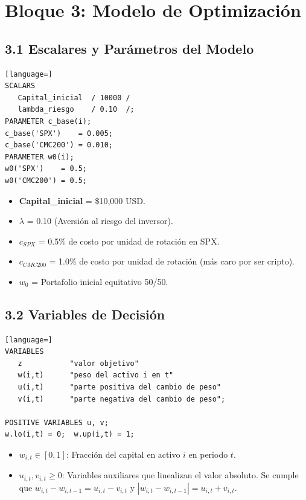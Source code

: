 \documentclass[11pt,a4paper]{article}
\begin{document}
\section{Bloque 3: Modelo de Optimización}

\subsection{3.1 Escalares y Parámetros del Modelo}
\begin{lstlisting}[language=]
SCALARS
   Capital_inicial  / 10000 /
   lambda_riesgo    / 0.10  /;
PARAMETER c_base(i);
c_base('SPX')    = 0.005;
c_base('CMC200') = 0.010;
PARAMETER w0(i);
w0('SPX')    = 0.5;
w0('CMC200') = 0.5;
\end{lstlisting}

\begin{itemize}
    \item \textbf{Capital\_inicial} = \$10,000 USD.
    \item \textbf{$\lambda$} = 0.10 (Aversión al riesgo del inversor).
    \item \textbf{$c_{SPX}$} = 0.5\% de costo por unidad de rotación en SPX.
    \item \textbf{$c_{CMC200}$} = 1.0\% de costo por unidad de rotación (más caro por ser cripto).
    \item \textbf{$w_0$} = Portafolio inicial equitativo 50/50.
\end{itemize}

\subsection{3.2 Variables de Decisión}
\begin{lstlisting}[language=]
VARIABLES
   z           "valor objetivo"
   w(i,t)      "peso del activo i en t"
   u(i,t)      "parte positiva del cambio de peso"
   v(i,t)      "parte negativa del cambio de peso";

POSITIVE VARIABLES u, v;
w.lo(i,t) = 0;  w.up(i,t) = 1;
\end{lstlisting}

\begin{itemize}
    \item $w_{i,t} \in [0, 1]$: Fracción del capital en activo $i$ en periodo $t$.
    \item $u_{i,t}, v_{i,t} \geq 0$: Variables auxiliares que linealizan el valor absoluto. Se cumple que $w_{i,t} - w_{i,t-1} = u_{i,t} - v_{i,t}$ y $|w_{i,t} - w_{i,t-1}| = u_{i,t} + v_{i,t}$.
\end{itemize}
\end{document}

